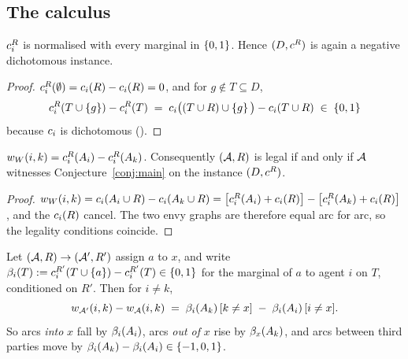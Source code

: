 \subsection{The calculus}
\label{sec:cri-calculus}

\begin{lemma}
\label{lem:cri-contract}
$c^{R}_i$ is normalised with every marginal in $\left\{0,1\right\}$. Hence
$(D, c^{R})$ is again a negative dichotomous instance.
\end{lemma}

\begin{proof}
$c^{R}_i(\emptyset) = c_i(R) - c_i(R) = 0$, and for
$g \notin T \subseteq D$,
\[
  c^{R}_i(T \cup \left\{g\right\}) - c^{R}_i(T)
  \;=\; c_i\big((T \cup R) \cup \left\{g\right\}\big) - c_i(T \cup R)
  \;\in\; \left\{0,1\right\}
\]
because $c_i$ is dichotomous ().
\end{proof}

\begin{lemma}
\label{lem:cri-witness}
$w_{W}(i,k) = c^{R}_i(A_{i}) - c^{R}_i(A_{k})$.
Consequently $(\mathcal{A},R)$ is legal if and only if $\mathcal{A}$ witnesses
Conjecture~\ref{conj:main} on the instance $(D, c^{R})$.
\end{lemma}

\begin{proof}
$w_{W}(i,k) = c_i(A_{i} \cup R) - c_i(A_{k}
\cup R) = \big[c^{R}_i(A_{i}) + c_i(R)\big] -
\big[c^{R}_i(A_{k}) + c_i(R)\big]$, and the $c_i(R)$ cancel.
The two envy graphs are therefore equal arc for arc, so the legality conditions
coincide.
\end{proof}

\begin{lemma}
\label{lem:cri-arcupdate}
Let $(\mathcal{A},R) \to (\mathcal{A}',R')$ assign $a$ to $x$, and write
$\beta_i(T) := c^{R'}_i(T \cup \left\{a\right\}) - c^{R'}_i(T) \in \left\{0,1\right\}$ for
the marginal of $a$ to agent $i$ on $T$, conditioned on $R'$. Then for $i \ne k$,
\[
  w_{\mathcal{A}'}(i,k) - w_{\mathcal{A}}(i,k)
  \;=\; \beta_i(A_{k})\,[k \ne x] \;-\; \beta_i(A_{i})\,[i \ne x].
\]
So arcs \emph{into} $x$ fall by $\beta_i(A_{i})$, arcs \emph{out of} $x$
rise by $\beta_x(A_{k})$, and arcs between third parties move by
$\beta_i(A_{k}) - \beta_i(A_{i}) \in \left\{-1,0,1\right\}$.
\end{lemma}

